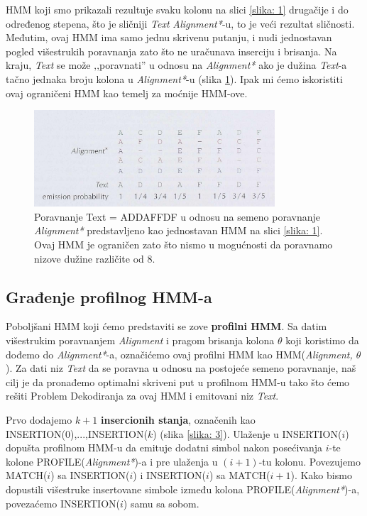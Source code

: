 HMM koji smo prikazali rezultuje svaku kolonu na slici \ref{slika: 1} drugačije i do određenog stepena, što je sličniji \textit{Text} \textit{Alignment*}-u, to je veći rezultat sličnosti. Međutim, ovaj HMM ima samo jednu skrivenu putanju, i nudi jednostavan pogled višestrukih poravnanja zato što ne uračunava inserciju i brisanja. Na kraju, \textit{Text} se može ‚‚poravnati'' u odnosu na \textit{Alignment*} ako je dužina \textit{Text}-a tačno jednaka broju kolona u \textit{Alignment*}-u (slika \ref{slika: 2}). Ipak mi ćemo iskoristiti ovaj ograničeni HMM kao temelj za moćnije HMM-ove.

\begin{figure}[H]
\centering
\includegraphics[width=0.8\textwidth]{poglavlja/10/slike/slika2.png}
\caption{Poravnanje Text = ADDAFFDF u odnosu na semeno poravnanje \textit{Alignment*} predstavljeno kao jednostavan HMM na slici \ref{slika: 1}. Ovaj HMM je ograničen zato što nismo u mogućnosti da poravnamo nizove dužine različite od 8. }
\label{slika: 2}
\end{figure}

\subsection{Građenje profilnog HMM-a}

Poboljšani HMM koji ćemo predstaviti se zove \textbf{profilni HMM}. Sa datim višestrukim poravnanjem \textit{Alignment} i pragom brisanja kolona $\theta$ koji koristimo da dođemo do \textit{Alignment*}-a, označićemo ovaj profilni HMM kao HMM(\textit{Alignment, $\theta$}). Za dati niz \textit{Text} da se poravna u odnosu na postojeće semeno poravnanje, naš cilj je da pronađemo optimalni skriveni put u profilnom HMM-u tako što ćemo rešiti Problem Dekodiranja za ovaj HMM i emitovani niz \textit{Text}.

Prvo dodajemo $ k+1 $ \textbf{insercionih stanja}, označenih kao INSERTION(0),...,INSERTION($ k $) (slika \ref{slika: 3}). Ulaženje u INSERTION($ i $) dopušta profilnom HMM-u da emituje dodatni simbol nakon posećivanja $ i $-te kolone PROFILE(\textit{Alignment*})-a i pre ulaženja u $ (i+1) $-tu kolonu. Povezujemo MATCH($ i $) sa INSERTION($ i $) i INSERTION($ i $) sa MATCH($ i+1 $). Kako bismo dopustili višestruke insertovane simbole između kolona PROFILE(\textit{Alignment*})-a, povezaćemo INSERTION($ i $) samu sa sobom.

